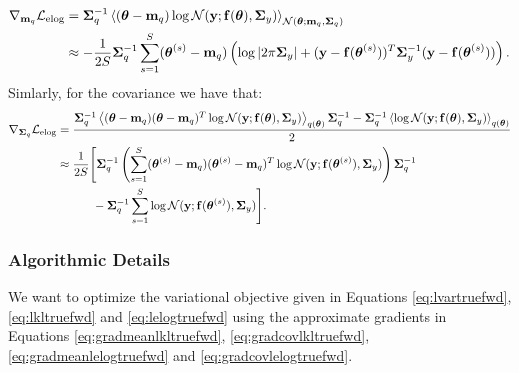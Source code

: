 \begin{align}
	\gradient_{\mq} \lelog  &= \Sigmaq^{-1} \Eb{ (\vectheta - \mq) \log \Normal(\vecy; \ftheta, \Sigmay) }_{\Normal(\vectheta; \mq, \Sigmaq)} \\
\label{eq:gradmeanlelogtruefwd}	
	& \approx  - \frac{1}{2S} \Sigmaq^{-1} \sum_{s=1}^{S}  (\thetas - \mq) \left( \log \det{2 \pi \Sigmay} +  (\vecy - \fthetas)^{T}\Sigmay^{-1}  (\vecy - \fthetas) \right) \text{.}
\end{align}
Simlarly, for the covariance we have that:
\begin{align}
	\gradient_{\Sigmaq} \lelog &=
	\frac{       \Sigmaq^{-1} \Eb{(\vectheta - \mq) (\vectheta-\mq)^{T} \log \Normal(\vecy; \ftheta, \Sigmay)}_{q(\vectheta)}  \Sigmaq^{-1}    -  \Sigmaq^{-1}  \Eb{  \log \Normal(\vecy; \ftheta, \Sigmay) }_{q(\vectheta)}  }{2} \\
\label{eq:gradcovlelogtruefwd}		
& \approx \frac{1}{2S} \Bigg[  
\Sigmaq^{-1} \left( \sum_{s=1}^{S} (\thetas - \mq) (\thetas-\mq)^{T} \log \Normal(\vecy; \fthetas, \Sigmay) \right)\Sigmaq^{-1}  \\
\nonumber
&	\quad \qquad - \Sigmaq^{-1} \sum_{s=1}^{S} \log \Normal(\vecy; \fthetas, \Sigmay) \Bigg] \text{.}
\end{align}
%
\subsubsection{Algorithmic Details}
We want to optimize the variational objective given in Equations \eqref{eq:lvartruefwd}, \eqref{eq:lkltruefwd}  and \eqref{eq:lelogtruefwd} using
the approximate gradients in Equations \eqref{eq:gradmeanlkltruefwd}, \eqref{eq:gradcovlkltruefwd}, \eqref{eq:gradmeanlelogtruefwd} and \eqref{eq:gradcovlelogtruefwd}.


%
